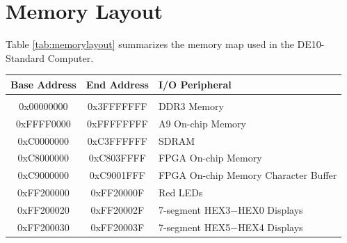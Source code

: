 \documentclass[11pt, twoside, pdftex]{article}
\newcommand{\systemName}{DE10-Standard Computer}
\begin{document}
\newpage
\section{Memory Layout}
\label{sec:mm}

\noindent
Table \ref{tab:memorylayout} summarizes the memory map used in the \systemName.
~\\

\begin{table}[h]
    \begin{center}
    \begin{tabular}{c|c|l}
            \textbf{Base Address}
            & \textbf{End Address}
            & \textbf{I/O Peripheral}
				\\\hline\vspace{-3mm}\\
            0x00000000
            & 0x3FFFFFFF
            & DDR3 Memory
        \\
            0xFFFF0000
            & 0xFFFFFFFF
            & A9 On-chip Memory
        \\
            0xC0000000
            & 0xC3FFFFFF
            & SDRAM
        \\
            0xC8000000
            & 0xC803FFFF
            & FPGA On-chip Memory
        \\
            0xC9000000
            & 0xC9001FFF
            & FPGA On-chip Memory Character Buffer
        \\
            0xFF200000
            & 0xFF20000F
            & Red LEDs
        \\
            0xFF200020
            & 0xFF20002F
            & 7-segment HEX3$-$HEX0 Displays
        \\
            0xFF200030
            & 0xFF20003F
            & 7-segment HEX5$-$HEX4 Displays


\end{tabular}
\end{center}
\end{table}
\end{document}
